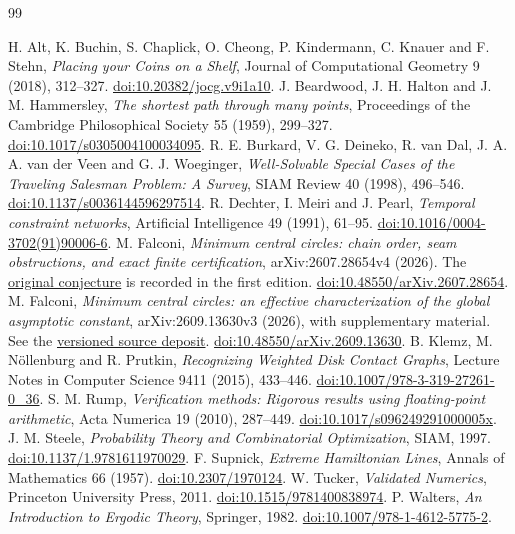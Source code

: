 \documentclass[11pt,letterpaper]{article}
\theoremstyle{definition}\newtheorem{definition}[theorem]{Definition}
\theoremstyle{remark}\newtheorem{remark}[theorem]{Remark}
\begin{document}
\begin{thebibliography}{99}
\small\raggedright
{} H. Alt, K. Buchin, S. Chaplick, O. Cheong, P. Kindermann, C. Knauer and F. Stehn, \emph{Placing your Coins on a Shelf}, Journal of Computational Geometry 9 (2018), 312--327.
\href{https://doi.org/10.20382/jocg.v9i1a10}{doi:10.20382/jocg.v9i1a10}.
 J. Beardwood, J. H. Halton and J. M. Hammersley, \emph{The shortest path through many points}, Proceedings of the Cambridge Philosophical Society 55 (1959), 299--327.
\href{https://doi.org/10.1017/s0305004100034095}{doi:10.1017/s0305004100034095}.
 R. E. Burkard, V. G. Deineko, R. van Dal, J. A. A. van der Veen and G. J. Woeginger, \emph{Well-Solvable Special Cases of the Traveling Salesman Problem: A Survey}, SIAM Review 40 (1998), 496--546.
\href{https://doi.org/10.1137/s0036144596297514}{doi:10.1137/s0036144596297514}.
 R. Dechter, I. Meiri and J. Pearl, \emph{Temporal constraint networks}, Artificial Intelligence 49 (1991), 61--95.
\href{https://doi.org/10.1016/0004-3702(91)90006-6}{doi:10.1016/0004-3702(91)90006-6}.
 M. Falconi, \emph{Minimum central circles: chain order, seam obstructions, and exact finite certification}, arXiv:2607.28654v4 (2026).
The \href{https://arxiv.org/abs/2607.28654v1}{original conjecture} is recorded in the first edition.
\href{https://doi.org/10.48550/arXiv.2607.28654}{doi:10.48550/arXiv.2607.28654}.
 M. Falconi, \emph{Minimum central circles: an effective characterization of the global asymptotic constant}, arXiv:2609.13630v3 (2026), with supplementary material.
See the \href{https://arxiv.org/src/2609.13630v3}{versioned source deposit}.
\href{https://doi.org/10.48550/arXiv.2609.13630}{doi:10.48550/arXiv.2609.13630}.
 B. Klemz, M. N\"ollenburg and R. Prutkin, \emph{Recognizing Weighted Disk Contact Graphs}, Lecture Notes in Computer Science 9411 (2015), 433--446.
\href{https://doi.org/10.1007/978-3-319-27261-0_36}{doi:10.1007/978-3-319-27261-0\_36}.
 S. M. Rump, \emph{Verification methods: Rigorous results using floating-point arithmetic}, Acta Numerica 19 (2010), 287--449.
\href{https://doi.org/10.1017/s096249291000005x}{doi:10.1017/s096249291000005x}.
 J. M. Steele, \emph{Probability Theory and Combinatorial Optimization}, SIAM, 1997.
\href{https://doi.org/10.1137/1.9781611970029}{doi:10.1137/1.9781611970029}.
 F. Supnick, \emph{Extreme Hamiltonian Lines}, Annals of Mathematics 66 (1957).
\href{https://doi.org/10.2307/1970124}{doi:10.2307/1970124}.
 W. Tucker, \emph{Validated Numerics}, Princeton University Press, 2011.
\href{https://doi.org/10.1515/9781400838974}{doi:10.1515/9781400838974}.
 P. Walters, \emph{An Introduction to Ergodic Theory}, Springer, 1982.
\href{https://doi.org/10.1007/978-1-4612-5775-2}{doi:10.1007/978-1-4612-5775-2}.
\end{thebibliography}
\end{document}
